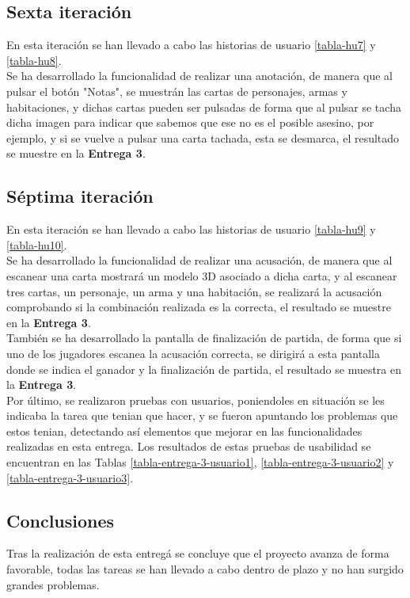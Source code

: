 \begin{itemize}
\subsection{Sexta iteración}
En esta iteración se han llevado a cabo las historias de usuario \ref{tabla-hu7} y \ref{tabla-hu8}.\\

Se ha desarrollado la funcionalidad de realizar una anotación, de manera que al pulsar el botón "Notas", se muestrán las cartas de personajes, armas y habitaciones, y dichas cartas pueden ser pulsadas de forma que al pulsar se tacha dicha imagen para indicar que sabemos que ese no es el posible asesino, por ejemplo, y si se vuelve a pulsar una carta tachada, esta se desmarca, el resultado se muestre en la \textbf{Entrega 3}.\\

\subsection{Séptima iteración}
En esta iteración se han llevado a cabo las historias de usuario \ref{tabla-hu9} y \ref{tabla-hu10}.\\

Se ha desarrollado la funcionalidad de realizar una acusación, de manera que al escanear una carta mostrará un modelo 3D asociado a dicha carta, y al escanear tres cartas, un personaje, un arma y una habitación, se realizará la acusación comprobando si la combinación realizada es la correcta, el resultado se muestre en la \textbf{Entrega 3}.\\

También se ha desarrollado la pantalla de finalización de partida, de forma que si uno de los jugadores escanea la acusación correcta, se dirigirá a esta pantalla donde se indica el ganador y la finalización de partida, el resultado se muestra en la \textbf{Entrega 3}.\\

Por último, se realizaron pruebas con usuarios, poniendoles en situación se les indicaba la tarea que tenian que hacer, y se fueron apuntando los problemas que estos tenian, detectando así elementos que mejorar en las funcionalidades realizadas en esta entrega. Los resultados de estas pruebas de usabilidad se encuentran en las Tablas \ref{tabla-entrega-3-usuario1}, \ref{tabla-entrega-3-usuario2} y \ref{tabla-entrega-3-usuario3}.


\subsection{Conclusiones}
Tras la realización de esta entregá se concluye que el proyecto avanza de forma favorable, todas las tareas se han llevado a cabo dentro de plazo y no han surgido grandes problemas.\\


\end{itemize}
